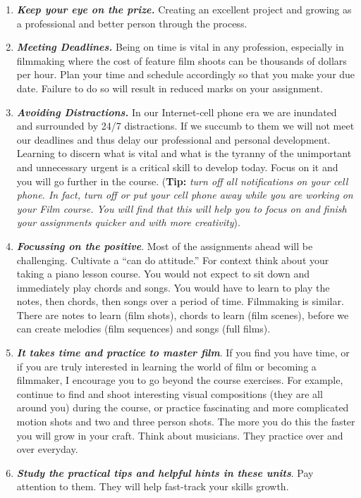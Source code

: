 \documentclass[
]{book}
\begin{document}
\begin{enumerate}
\def\labelenumi{\arabic{enumi}.}
\item
  \textbf{\emph{Keep your eye on the prize.}} Creating an excellent project and growing as a professional and better person through the process.
\item
  \textbf{\emph{Meeting Deadlines.}} Being on time is vital in any profession, especially in filmmaking where the cost of feature film shoots can be thousands of dollars per hour. Plan your time and schedule accordingly so that you make your due date. Failure to do so will result in reduced marks on your assignment.
\item
  \textbf{\emph{Avoiding Distractions.}} In our Internet-cell phone era we are inundated and surrounded by 24/7 distractions. If we succumb to them we will not meet our deadlines and thus delay our professional and personal development. Learning to discern what is vital and what is the tyranny of the unimportant and unnecessary urgent is a critical skill to develop today. Focus on it and you will go further in the course. (\textbf{Tip:} \emph{turn off all notifications on your cell phone. In fact, turn off or put your cell phone away while you are working on your Film course. You will find that this will help you to focus on and finish your assignments quicker and with more creativity}).
\item
  \textbf{\emph{Focussing on the positive}}. Most of the assignments ahead will be challenging. Cultivate a ``can do attitude.'' For context think about your taking a piano lesson course. You would not expect to sit down and immediately play chords and songs. You would have to learn to play the notes, then chords, then songs over a period of time. Filmmaking is similar. There are notes to learn (film shots), chords to learn (film scenes), before we can create melodies (film sequences) and songs (full films).
\item
  \textbf{\emph{It takes time and practice to master film}}. If you find you have time, or if you are truly interested in learning the world of film or becoming a filmmaker, I encourage you to go beyond the course exercises. For example, continue to find and shoot interesting visual compositions (they are all around you) during the course, or practice fascinating and more complicated motion shots and two and three person shots. The more you do this the faster you will grow in your craft. Think about musicians. They practice over and over everyday.
\item
  \textbf{\emph{Study the practical tips and helpful hints in these units}}. Pay attention to them. They will help fast-track your skills growth.

\end{enumerate}
\end{document}
